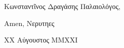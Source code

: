 \documentclass[a4paper,11pt]{article}
\begin{document}
    \rmfamily


    Κωνσταντῖνος Δραγάσης Παλαιολόγος,
    \vspace{1em}



    \lipsum[1]

    \lipsum[2]



    \vspace{1em}
    Amen,\linebreak
    Νερυτηες

    {\footnotesize XX Αύγουστος MMXXI}
\end{document}
